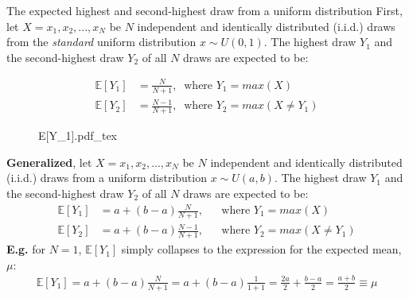 \begin{frame}{The expected highest and second-highest draw from a uniform distribution}
    First, let $X=x_1,x_2,...,x_N$ be $N$ independent and identically distributed (i.i.d.) draws from the \textit{standard} uniform distribution $x\sim U(0, 1)$. The highest draw $Y_1$ and the second-highest draw $Y_2$ of all $N$ draws are expected to be: \vspace{-10pt}
    \begin{multicols}{2}
      \begin{align*}
        \mathbb{E}[Y_1]&=\frac{N}{N+1},\ \text{ where }Y_1=max(X)\\
        \mathbb{E}[Y_2]&=\frac{N-1}{N+1},\ \text{ where }Y_2=max(X\neq Y_1)
      \end{align*}
      \vfill\null\columnbreak
      \begin{figure}[!h]
        \center
        \def\svgwidth{1.1\columnwidth}
        {E[Y_1].pdf_tex}
      \end{figure}
      \vfill\null
    \end{multicols} \vspace{-24pt}
    \textbf{Generalized}, let $X=x_1,x_2,...,x_N$ be $N$ independent and identically distributed (i.i.d.) draws from a uniform distribution $x\sim U(a, b)$. The highest draw $Y_1$ and the second-highest draw $Y_2$ of all $N$ draws are expected to be:\vspace{-2pt}
    \begin{align*}
      \mathbb{E}[Y_1]&=a+(b-a)\frac{N}{N+1},&&\text{where }Y_1=max(X)\\
      \mathbb{E}[Y_2]&=a+(b-a)\frac{N-1}{N+1},&&\text{where }Y_2=max(X\neq Y_1)
    \end{align*}
    \textbf{E.g.} for $N=1$, $\mathbb{E}[Y_1]$ simply collapses to the expression for the expected mean, $\mu$:\vspace{-2pt}
    \begin{align*}
      \mathbb{E}[Y_1]=a+(b-a)\frac{N}{N+1}=a+(b-a)\frac{1}{1+1}
      =\frac{2a}{2}+\frac{b-a}{2}=\frac{a+b}{2}\equiv\mu
    \end{align*}
\end{frame}


